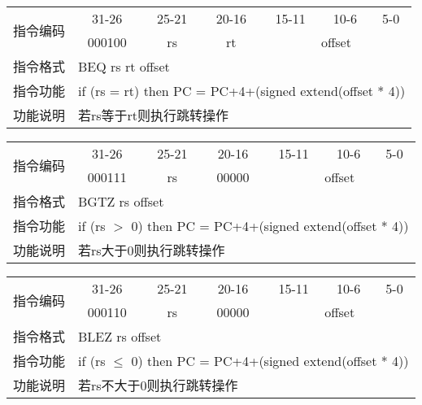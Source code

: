	\begin{table}[!hbp]
		\centering
		\begin{tabular}{|c|c|c|c|c|c|c|}
		\hline
		\multirow{2}{*}{指令编码} & 31-26&25-21 & 20-16&15-11 &10-6 &5-0\\
		\cline{2-7} & 000100 & rs & rt & \multicolumn{3}{|c|}{offset} \\
		\hline
		指令格式&\multicolumn{6}{|l|}{BEQ rs rt offset}\\
		\hline		
		指令功能&\multicolumn{6}{|l|}{if (rs = rt) then PC = PC+4+(signed extend(offset * 4))}\\
		\hline		
		功能说明&\multicolumn{6}{|l|}{若rs等于rt则执行跳转操作}\\
		\hline
		\end{tabular}
	\end{table}
	\begin{table}[!hbp]
		\centering
		\begin{tabular}{|c|c|c|c|c|c|c|}
		\hline
		\multirow{2}{*}{指令编码} & 31-26&25-21 & 20-16&15-11 &10-6 &5-0\\
		\cline{2-7} & 000111 & rs & 00000 & \multicolumn{3}{|c|}{offset} \\
		\hline
		指令格式&\multicolumn{6}{|l|}{BGTZ rs offset}\\
		\hline		
		指令功能&\multicolumn{6}{|l|}{if (rs $>$ 0) then PC = PC+4+(signed extend(offset * 4))}\\
		\hline		
		功能说明&\multicolumn{6}{|l|}{若rs大于0则执行跳转操作}\\
		\hline
		\end{tabular}
	\end{table}
	\begin{table}[!hbp]
		\centering
		\begin{tabular}{|c|c|c|c|c|c|c|}
		\hline
		\multirow{2}{*}{指令编码} & 31-26&25-21 & 20-16&15-11 &10-6 &5-0\\
		\cline{2-7} & 000110 & rs & 00000 & \multicolumn{3}{|c|}{offset} \\
		\hline
		指令格式&\multicolumn{6}{|l|}{BLEZ rs offset}\\
		\hline		
		指令功能&\multicolumn{6}{|l|}{if (rs $\leq$ 0) then PC = PC+4+(signed extend(offset * 4))}\\
		\hline		
		功能说明&\multicolumn{6}{|l|}{若rs不大于0则执行跳转操作}\\
		\hline
		\end{tabular}
	\end{table}
